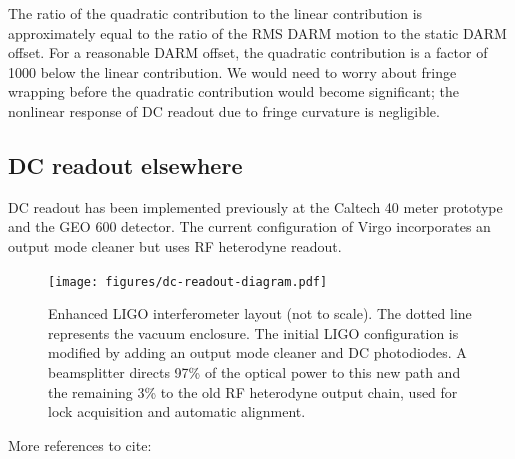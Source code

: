 The ratio of the quadratic contribution to the linear contribution is
approximately equal to the ratio of the RMS DARM motion to the static
DARM offset.  For a reasonable DARM offset, the quadratic contribution
is a factor of 1000 below the linear contribution.  We would need to
worry about fringe wrapping before the quadratic contribution would
become significant; the nonlinear response of DC readout due to fringe
curvature is negligible.

\subsection{DC readout elsewhere}
DC readout has been implemented previously at the Caltech 40 meter
prototype \cite{Ward2008DC,RobWardThesis} and the GEO 600
detector\cite{GeoDC,Prijatelj2010,Degallaix2010Commissioning}.  The
current configuration of Virgo incorporates an output mode cleaner but
uses RF heterodyne readout\cite{Acernese2008Virgo}.

\begin{figure}
\texttt{[image: figures/dc-readout-diagram.pdf]}
\caption[Enhanced LIGO interferometer
  layout]{\label{fig:dc-readout-ifo}Enhanced LIGO interferometer
  layout (not to scale).  The dotted line represents the vacuum
  enclosure. The initial LIGO configuration is modified by adding an
  output mode cleaner and DC photodiodes.  A beamsplitter directs 97\%
  of the optical power to this new path and the remaining 3\% to the
  old RF heterodyne output chain, used for lock acquisition and
  automatic alignment.}
\end{figure}

More references to cite:
\cite{Adhikari2009DC} %
\cite{Hild2007Novel} %

